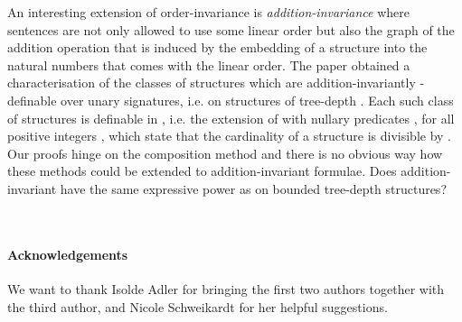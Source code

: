 \documentclass[11pt]{article}
\begin{document}
An interesting extension of order-invariance is
\emph{addition-invariance} where sentences are not only allowed to use
some linear order but also the graph of the addition operation that is
induced by the embedding of a structure into the natural numbers that
comes with the linear order.  The paper \cite{Schweikardt2010}
obtained a characterisation of the classes of structures which are
addition-invariantly -definable over unary signatures, i.e. on
structures of tree-depth .  Each such class of structures is
definable in , i.e. the extension of 
with nullary predicates , for all positive integers , which
state that the cardinality of a structure is divisible by .  Our
proofs hinge on the composition method and there is no obvious way how
these methods could be extended to addition-invariant formulae.  Does
addition-invariant  have the same expressive power as
 on bounded tree-depth structures?




\
\paragraph{Acknowledgements} 

We want to thank Isolde Adler for bringing the first two authors together with
the third author, and Nicole Schweikardt for her helpful suggestions.



\end{document}
